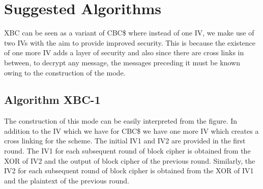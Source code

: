 \documentclass[conference]{IEEEtran}
\begin{document}
%



\section{Suggested Algorithms}

XBC can be seen as a variant of CBC\$ where instead of one IV, we make use of two IVs with the aim to provide improved security. This is because the existence of one more IV adds a layer of security and also since there are cross links in between, to decrypt any message, the messages preceding it must be known owing to the construction of the mode. 

\subsection{Algorithm XBC-1}

The construction of this mode can be easily interpreted from the figure. In addition to the IV which we have for CBC\$ we have one more IV which creates a cross linking for the scheme. The initial IV1 and IV2 are provided in the first round. The IV1 for each subsequent round of block cipher is obtained from the XOR of IV2 and the output of block cipher of the previous round. Similarly, the IV2 for each subsequent round of block cipher is obtained from the XOR of IV1 and the plaintext of the previous round. 
\end{document}
